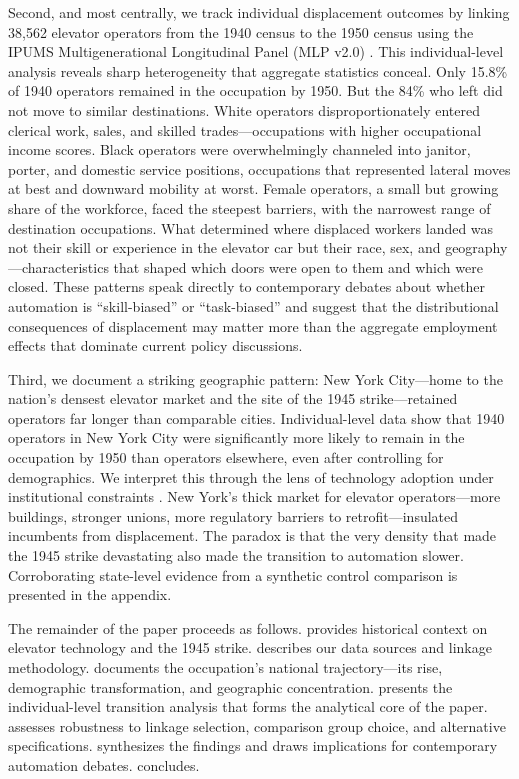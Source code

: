 \documentclass[12pt]{article}
\begin{document}
Second, and most centrally, we track individual displacement outcomes by linking 38,562 elevator operators from the 1940 census to the 1950 census using the IPUMS Multigenerational Longitudinal Panel (MLP v2.0) \citep{ruggles2021}. This individual-level analysis reveals sharp heterogeneity that aggregate statistics conceal. Only 15.8\% of 1940 operators remained in the occupation by 1950. But the 84\% who left did not move to similar destinations. White operators disproportionately entered clerical work, sales, and skilled trades---occupations with higher occupational income scores. Black operators were overwhelmingly channeled into janitor, porter, and domestic service positions, occupations that represented lateral moves at best and downward mobility at worst. Female operators, a small but growing share of the workforce, faced the steepest barriers, with the narrowest range of destination occupations. What determined where displaced workers landed was not their skill or experience in the elevator car but their race, sex, and geography---characteristics that shaped which doors were open to them and which were closed. These patterns speak directly to contemporary debates about whether automation is ``skill-biased'' or ``task-biased'' \citep{goldinkatz2008, autor2003, acemoglu2019} and suggest that the distributional consequences of displacement may matter more than the aggregate employment effects that dominate current policy discussions.

Third, we document a striking geographic pattern: New York City---home to the nation's densest elevator market and the site of the 1945 strike---retained operators far longer than comparable cities. Individual-level data show that 1940 operators in New York City were significantly more likely to remain in the occupation by 1950 than operators elsewhere, even after controlling for demographics. We interpret this through the lens of technology adoption under institutional constraints \citep{david1990, mokyr1992, comin2010}. New York's thick market for elevator operators---more buildings, stronger unions, more regulatory barriers to retrofit---insulated incumbents from displacement. The paradox is that the very density that made the 1945 strike devastating also made the transition to automation slower. Corroborating state-level evidence from a synthetic control comparison is presented in the appendix.

The remainder of the paper proceeds as follows.  provides historical context on elevator technology and the 1945 strike.  describes our data sources and linkage methodology.  documents the occupation's national trajectory---its rise, demographic transformation, and geographic concentration.  presents the individual-level transition analysis that forms the analytical core of the paper.  assesses robustness to linkage selection, comparison group choice, and alternative specifications.  synthesizes the findings and draws implications for contemporary automation debates.  concludes.
\end{document}
